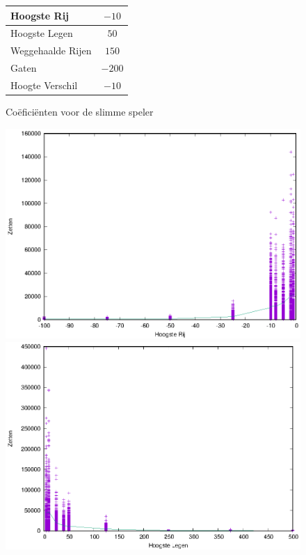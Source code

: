 \documentclass[10pt]{article}
\begin{document}
\begin{figure}
\begin{center}
\begin{tabular}{l|c}
	Hoogste Rij		& $-10$ \\ \hline
	Hoogste Legen		& $50$ \\ \hline
	Weggehaalde Rijen	& $150$ \\ \hline
	Gaten			& $-200$ \\ \hline
	Hoogte Verschil		& $-10$ \\
\end{tabular}
\end{center}
\caption{Co\"{e}fici\"{e}nten voor de slimme speler}\label{fig:smart_coef}
\end{figure}

\begin{figure}
	\begin{center}
	\includegraphics[height="5cm"]{div1.eps}
	\includegraphics[height="5cm"]{div2.eps}

\end{center}
\end{figure}
\end{document}
